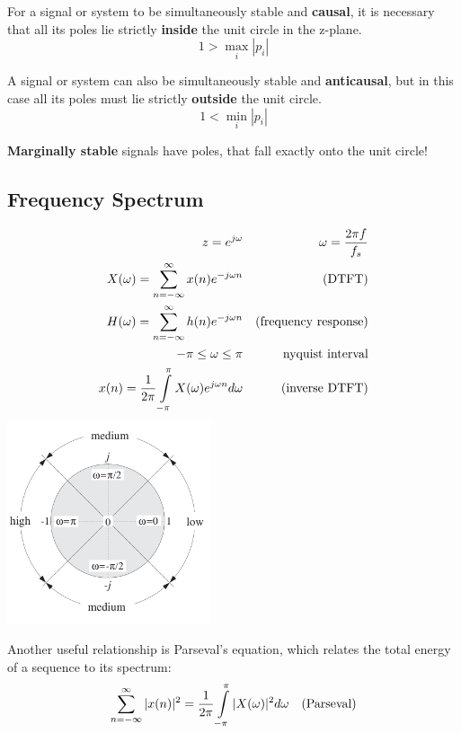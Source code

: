 For a signal or system to be simultaneously stable and \textbf{causal}, it is necessary that all its poles lie strictly 
\textbf{inside} the unit circle in the z-plane. 
\[ 1 > \max\limits_{i}|p_i| \]

A signal or system
can also be simultaneously stable and \textbf{anticausal}, but in this case all its poles must lie
strictly \textbf{outside} the unit circle.
\[ 1 < \min\limits_{i}|p_i| \]

\textbf{Marginally stable} signals have poles, that fall exactly onto the unit circle!

\subsection{Frequency Spectrum}
\begin{multicols}{2}
	\begin{align}
	z=e^{j\omega} && \omega = \frac{2 \pi f}{f_s} \notag\\
	X(\omega)= \sum\limits_{n=-\infty}^{\infty} x(n)e^{-j\omega n} &&  \text{(DTFT)} \notag \\
	H(\omega)= \sum\limits_{n=-\infty}^{\infty} h(n)e^{-j\omega n} &&  \text{(frequency response)} \notag \\
	 -\pi \leq \omega \leq \pi && \text{nyquist interval}\notag\\
	x(n)= \frac{1}{2\pi} \int\limits_{-\pi}^{\pi} X(\omega)e^{j\omega n} d\omega &&\text{(inverse DTFT)} \notag
	\end{align}
\columnbreak
  \includegraphics[width=6cm]{./picture/freq_spect}
\end{multicols}

Another useful relationship is Parseval’s equation, which relates the total energy of a sequence to its spectrum: 
\begin{align}
\sum_{n=-\infty}^{\infty} |x(n)|^2= \frac{1}{2\pi} \int\limits_{-\pi}^{\pi} |X(\omega)|^2 d\omega && \text{(Parseval)} \notag
\end{align}


